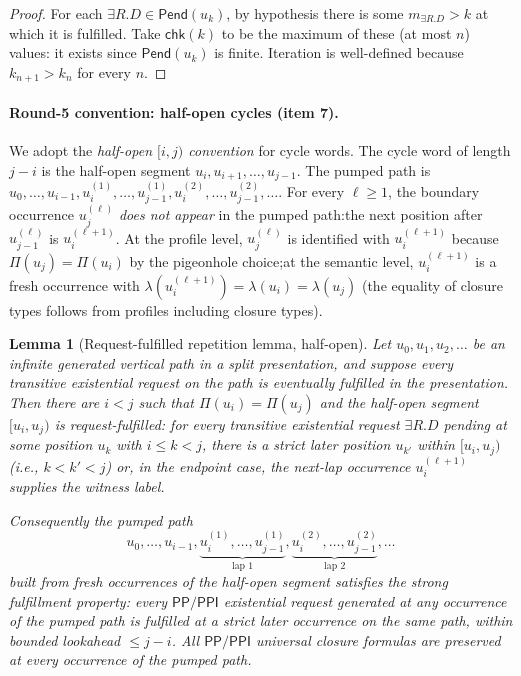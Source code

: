 \documentclass[11pt]{article}
\newtheorem{lemma}[theorem]{Lemma}
\newcommand{\PP}{\mathsf{PP}}
\newcommand{\PPI}{\mathsf{PPI}}
\begin{document}
\begin{proof}
For each $\exists R.D\in\mathsf{Pend}(u_k)$, by hypothesis there is
some $m_{\exists R.D}>k$ at which it is fulfilled.  Take
$\mathsf{chk}(k)$ to be the maximum of these (at most $n$) values:
it exists since $\mathsf{Pend}(u_k)$ is finite.  Iteration is
well-defined because $k_{n+1}>k_n$ for every $n$.
\end{proof}

\paragraph{Round-5 convention: half-open cycles (item 7).}
We adopt the \emph{half-open $[i,j)$ convention} for cycle words.
The cycle word of length $j-i$ is the half-open segment
$u_i,u_{i+1},\ldots,u_{j-1}$.  The pumped path is
$u_0,\ldots,u_{i-1}, u_i^{(1)},\ldots,u_{j-1}^{(1)},
u_i^{(2)},\ldots,u_{j-1}^{(2)},\ldots$.  For every $\ell\ge 1$, the
boundary occurrence $u_j^{(\ell)}$ \emph{does not appear} in the
pumped path:\@ the next position after $u_{j-1}^{(\ell)}$ is
$u_i^{(\ell+1)}$.  At the profile level, $u_j^{(\ell)}$ is
identified with $u_i^{(\ell+1)}$ because $\Pi(u_j)=\Pi(u_i)$ by the
pigeonhole choice;\@ at the semantic level, $u_i^{(\ell+1)}$ is a
fresh occurrence with $\lambda(u_i^{(\ell+1)})=\lambda(u_i)
=\lambda(u_j)$ (the equality of closure types follows from
profiles including closure types).

\begin{lemma}[Request-fulfilled repetition lemma, half-open]\label{lem:request-cycle}
Let $u_0,u_1,u_2,\ldots$ be an infinite generated vertical path in
a split presentation, and suppose every transitive existential
request on the path is eventually fulfilled in the presentation.
Then there are $i<j$ such that $\Pi(u_i)=\Pi(u_j)$ and the
\emph{half-open} segment $[u_i,u_j)$ is \emph{request-fulfilled}:\@
for every transitive existential request $\exists R.D$ pending at
some position $u_k$ with $i\le k<j$, there is a strict later
position $u_{k'}$ within $[u_i,u_j)$ (i.e., $k<k'<j$) or, in the
\emph{endpoint case}, the next-lap occurrence
$u_i^{(\ell+1)}$ supplies the witness label.

Consequently the pumped path
\[
  u_0,\ldots,u_{i-1},
  \underbrace{u_i^{(1)},\ldots,u_{j-1}^{(1)}}_{\text{lap }1},
  \underbrace{u_i^{(2)},\ldots,u_{j-1}^{(2)}}_{\text{lap }2},\ldots
\]
built from fresh occurrences of the half-open segment satisfies
the strong fulfillment property: every $\PP/\PPI$ existential
request generated at any occurrence of the pumped path is fulfilled
at a strict later occurrence on the same path, within bounded
lookahead $\le j-i$.  All $\PP/\PPI$ universal closure formulas
are preserved at every occurrence of the pumped path.
\end{lemma}
\end{document}
